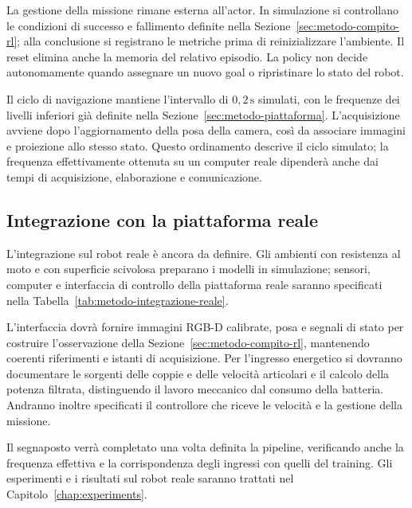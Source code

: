 La gestione della missione rimane esterna all'actor. In simulazione si controllano le condizioni di successo e fallimento definite nella Sezione~\ref{sec:metodo-compito-rl}; alla conclusione si registrano le metriche prima di reinizializzare l'ambiente. Il reset elimina anche la memoria del relativo episodio. La policy non decide autonomamente quando assegnare un nuovo goal o ripristinare lo stato del robot.

Il ciclo di navigazione mantiene l'intervallo di $0{,}2\,\mathrm{s}$ simulati, con le frequenze dei livelli inferiori già definite nella Sezione~\ref{sec:metodo-piattaforma}. L'acquisizione avviene dopo l'aggiornamento della posa della camera, così da associare immagini e proiezione allo stesso stato. Questo ordinamento descrive il ciclo simulato; la frequenza effettivamente ottenuta su un computer reale dipenderà anche dai tempi di acquisizione, elaborazione e comunicazione.

\subsection{Integrazione con la piattaforma reale}

L'integrazione sul robot reale è ancora da definire. Gli ambienti con resistenza al moto e con superficie scivolosa preparano i modelli in simulazione; sensori, computer e interfaccia di controllo della piattaforma reale saranno specificati nella Tabella~\ref{tab:metodo-integrazione-reale}.

L'interfaccia dovrà fornire immagini RGB-D calibrate, posa e segnali di stato per costruire l'osservazione della Sezione~\ref{sec:metodo-compito-rl}, mantenendo coerenti riferimenti e istanti di acquisizione. Per l'ingresso energetico si dovranno documentare le sorgenti delle coppie e delle velocità articolari e il calcolo della potenza filtrata, distinguendo il lavoro meccanico dal consumo della batteria. Andranno inoltre specificati il controllore che riceve le velocità e la gestione della missione.

Il segnaposto verrà completato una volta definita la pipeline, verificando anche la frequenza effettiva e la corrispondenza degli ingressi con quelli del training. Gli esperimenti e i risultati sul robot reale saranno trattati nel Capitolo~\ref{chap:experiments}.

